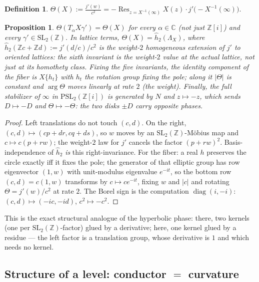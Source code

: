 \documentclass[11pt]{amsart}
\numberwithin{equation}{section}
\theoremstyle{plain}
\newtheorem{proposition}[theorem]{Proposition}
\theoremstyle{definition}
\newtheorem{definition}[theorem]{Definition}
\theoremstyle{remark}
\newcommand{\C}{\mathbb{C}}
\newcommand{\Z}{\mathbb{Z}}
\newcommand{\Zi}{\Z[i]}
\newcommand{\SL}{\mathrm{SL}}
\newcommand{\PSL}{\mathrm{PSL}}
\begin{document}
\begin{definition}\label{def:euctheta}
$\displaystyle
\Theta(X) := \frac{j'(w)}{c^2}
= -\operatorname*{Res}_{z = X^{-1}(\infty)}X(z)\cdot
j'\bigl(-X^{-1}(\infty)\bigr)$.
\end{definition}

\begin{proposition}\label{prop:eucinv}
$\Theta(T_{\alpha}X\gamma') = \Theta(X)$ for every $\alpha \in \C$
(not just $\Zi$) and every $\gamma' \in \SL_2(\Z)$.  In lattice terms,
$\Theta(X) = \hat h_2(\Lambda_X)$, where $\hat h_2(\Z c + \Z d) :=
j'(d/c)/c^2$ is the weight-$2$ homogeneous extension of $j'$ to
oriented lattices: \emph{the sixth invariant is the weight-$2$ value
at the actual lattice}, not just at its homothety class.  Fixing the
five invariants, the identity component of the fiber is $X\{h_t\}$
with $h_t$ the rotation group fixing the pole; along it $|\Theta|$ is
constant and $\arg\Theta$ moves linearly at rate $2$ (the weight).
Finally, the full stabilizer of $\infty$ in $\PSL_2(\Zi)$ is generated
by $N$ and $z \mapsto -z$, which sends $D \mapsto -D$ and $\Theta
\mapsto -\Theta$: the two disks $\pm D$ carry opposite phases.
\end{proposition}

\begin{proof}
Left translations do not touch $(c, d)$.  On the right, $(c, d)
\mapsto (cp + dr, cq + ds)$, so $w$ moves by an $\SL_2(\Z)$-M\"obius
map and $c \mapsto c(p + rw)$; the weight-$2$ law for $j'$ cancels the
factor $(p + rw)^2$.  Basis-independence of $\hat h_2$ \emph{is} this
right-invariance.  For the fiber: a real $h$ preserves the circle
exactly iff it fixes the pole; the generator of that elliptic group
has row eigenvector $(1, w)$ with unit-modulus eigenvalue $e^{-it}$,
so the bottom row $(c, d) = c(1, w)$ transforms by $c \mapsto
ce^{-it}$, fixing $w$ and $|c|$ and rotating $\Theta = j'(w)/c^2$ at
rate $2$.  The Borel sign is the computation
$\operatorname{diag}(i, -i)$: $(c, d) \mapsto (-ic, -id)$, $c^2
\mapsto -c^2$.
\end{proof}

This is the exact structural analogue of the hyperbolic phase: there,
two kernels (one per $\SL_2(\Z)$-factor) glued by a derivative; here,
one kernel glued by a residue --- the left factor is a translation
group, whose derivative is $1$ and which needs no kernel.

\subsection{Structure of a level: conductor $=$ curvature}
\label{subsec:eucstructure}
\end{document}
